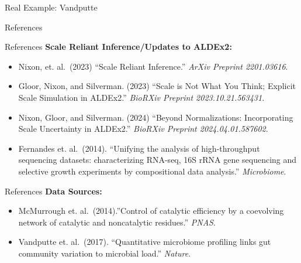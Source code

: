 \documentclass[
  ignorenonframetext,
]{beamer}
\begin{document}
\begin{frame}{Real Example: Vandputte}
\protect\hypertarget{real-example-vandputte}{}
\end{frame}

\begin{frame}{References}
\protect\hypertarget{references}{}
\end{frame}

\begin{frame}{References}
\protect\hypertarget{references-1}{}
\textbf{Scale Reliant Inference/Updates to ALDEx2:}

\begin{itemize}
\item
  Nixon, et. al.~(2023) ``Scale Reliant Inference.'' \emph{ArXiv
  Preprint 2201.03616}.
\item
  Gloor, Nixon, and Silverman. (2023) ``Scale is Not What You Think;
  Explicit Scale Simulation in ALDEx2.'' \emph{BioRXiv Preprint
  2023.10.21.563431}.
\item
  Nixon, Gloor, and Silverman. (2024) ``Beyond Normalizations:
  Incorporating Scale Uncertainty in ALDEx2.'' \emph{BioRXiv Preprint
  2024.04.01.587602}.
\item
  Fernandes et. al.~(2014). ``Unifying the analysis of high-throughput
  sequencing datasets: characterizing RNA-seq, 16S rRNA gene sequencing
  and selective growth experiments by compositional data analysis.''
  \emph{Microbiome}.
\end{itemize}
\end{frame}

\begin{frame}{References}
\protect\hypertarget{references-2}{}
\textbf{Data Sources:}

\begin{itemize}
\item
  McMurrough et. al.~(2014).''Control of catalytic efficiency by a
  coevolving network of catalytic and noncatalytic residues.''
  \emph{PNAS}.
\item
  Vandputte et. al.~(2017). ``Quantitative microbiome profiling links
  gut community variation to microbial load.'' \emph{Nature}.
\end{itemize}
\end{frame}
\end{document}
